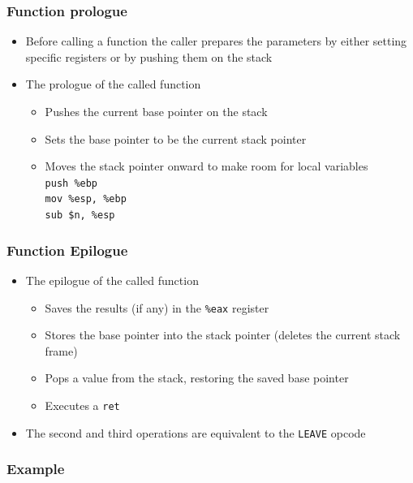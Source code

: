 \documentclass[12pt]{beamer}
\begin{document}
	\begin{frame}{}
		\frametitle{Function prologue}
		\begin{itemize}
			\item Before calling a function the caller prepares the parameters by 
			either setting specific registers or by pushing them on the stack
			\item The prologue of the called function
			\begin{itemize}
				\item Pushes the current base pointer on the stack
				\item Sets the base pointer to be the current stack pointer
				\item Moves the stack pointer onward to make room for local variables \\
				\texttt{push \%ebp} \\
				\texttt{mov \%esp, \%ebp} \\
				\texttt{sub \$n, \%esp} \\
			\end{itemize}
		\end{itemize}
	\end{frame}	 
	
	\begin{frame}
		\frametitle{Function Epilogue}
		\begin{itemize}
			\item The epilogue of the called function
			\begin{itemize}
				\item Saves the results (if any) in the \texttt{\%eax} register
				\item Stores the base pointer into the stack pointer (deletes the current
				 stack frame)
				\item Pops a value from the stack, restoring the saved base pointer
				\item Executes a \texttt{ret}
			\end{itemize}
			\item The second and third operations are equivalent to the \texttt{LEAVE} opcode
		\end{itemize}
	\end{frame}
	
	\begin{frame}[fragile]
	\frametitle{Example}
	\small
	
		
	\end{frame}
	
	
\end{document}
